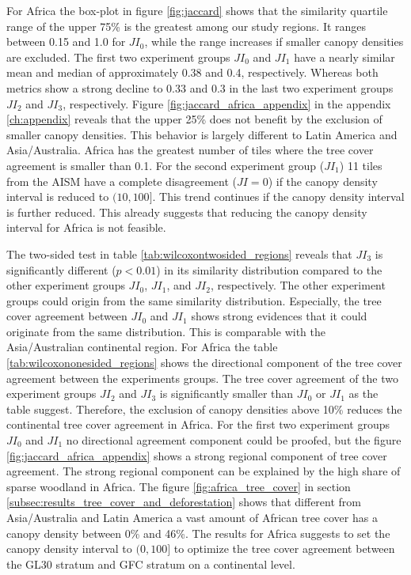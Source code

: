 			For Africa the box-plot in figure \ref{fig:jaccard} shows that the similarity quartile range of the upper 75\% is the greatest among our study regions. It ranges between 0.15 and 1.0 for $JI_0$, while the range increases if smaller canopy densities are excluded. The first two experiment groups $JI_0$ and $JI_1$ have a nearly similar mean and median of approximately 0.38 and 0.4, respectively. Whereas both metrics show a strong decline to 0.33 and 0.3 in the last two experiment groups $JI_2$ and $JI_3$, respectively. Figure \ref{fig:jaccard_africa_appendix} in the appendix \ref{ch:appendix} reveals that the upper 25\% does not benefit by the exclusion of smaller canopy densities. This behavior is largely different to Latin America and Asia/Australia. Africa has the greatest number of tiles where the tree cover agreement is smaller than 0.1. For the second experiment group ($JI_1$) 11 tiles from the \ac{AISM} have a complete disagreement ($JI=0$) if the canopy density interval is reduced to $(10,100]$. This trend continues if the canopy density interval is further reduced. This already suggests that reducing the canopy density interval for Africa is not feasible. 

			The two-sided test in table \ref{tab:wilcoxontwosided_regions} reveals that $JI_3$ is significantly different ($p<0.01$) in its similarity distribution compared to the other experiment groups $JI_0$, $JI_1$, and $JI_2$, respectively. The other experiment groups could origin from the same similarity distribution. Especially, the tree cover agreement between $JI_0$ and $JI_1$ shows strong evidences that it could originate from the same distribution. This is comparable with the Asia/Australian continental region. For Africa the table \ref{tab:wilcoxononesided_regions} shows the directional component of the tree cover agreement between the experiments groups. The tree cover agreement of the two experiment groups $JI_2$ and $JI_3$ is significantly smaller than $JI_0$ or $JI_1$ as the table suggest. Therefore, the exclusion of canopy densities above 10\% reduces the continental tree cover agreement in Africa. For the first two experiment groups $JI_0$ and $JI_1$ no directional agreement component could be proofed, but the figure \ref{fig:jaccard_africa_appendix} shows a strong regional component of tree cover agreement. The strong regional component can be explained by the high share of sparse woodland in Africa. The figure \ref{fig:africa_tree_cover} in section \ref{subsec:results_tree_cover_and_deforestation} shows that different from Asia/Australia and Latin America a vast amount of African tree cover has a canopy density between 0\% and 46\%. The results for Africa suggests to set the canopy density interval to $(0,100]$ to optimize the tree cover agreement between the \ac{GL30} stratum and \ac{GFC} stratum on a continental level.


